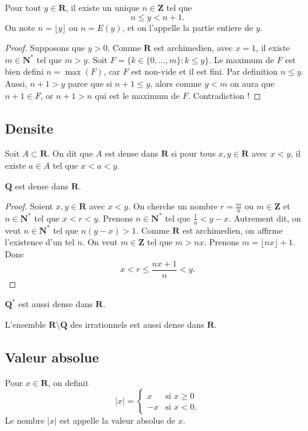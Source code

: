 \begin{proposition}
Pour tout $y\in \mathbf{R}$, il existe un unique $n\in \mathbf{Z}$ tel que 
$$
n\le y <n+1.
$$
On note $n=\lfloor y \rfloor$ ou $n=E(y)$, et on l'appelle la partie entiere de $y$.
\end{proposition}
\begin{proof}
Supposons que $y>0$. Comme $\mathbf{R}$ est archimedien, avec $x=1$, il existe $m\in \mathbf{N}^{*}$ tel que $m>y$. Soit $F=\{ k\in \{ 0,\dots,m \}:k\le y \}$. Le maximum de $F$ est bien defini $n=\max (F)$, car $F$ est non-vide et il est fini. Par definition $n\le y$. Aussi, $n+1>y$ parce que si $n+1\le y$, alors comme $y<m$ on aura que $n+1\in F$, or $n+1>n$ qui est le maximum de $F$. Contradiction !
\end{proof}

\subsection{Densite}
\begin{definition}[Densite]
Soit $A\subset \mathbf{R}$. On dit que $A$ est dense dans $\mathbf{R}$ si pour tous $x,y\in \mathbf{R}$ avec $x<y$, il existe $a\in A$ tel que $x<a<y$.
\end{definition}
\begin{theorem}
$\mathbf{Q}$ est dense dans $\mathbf{R}$.
\end{theorem}
\begin{proof}
Soient $x,y\in \mathbf{R}$ avec $x<y$. On cherche un nombre $r=\frac{m}{n}$ ou $m\in \mathbf{Z}$ et $n\in \mathbf{N}^{*}$ tel que $x<r<y$. Prenons $n\in \mathbf{N}^{*}$ tel que $\frac{1}{n}<y-x$. Autrement dit, on veut $n\in \mathbf{N}^{*}$ tel que $n(y-x)>1$. Comme $\mathbf{R}$ est archimedien, on affirme l'existence d'un tel $n$. On veut $m\in \mathbf{Z}$ tel que $m>nx$. Prenons $m=\lfloor nx \rfloor +1$. Donc
$$
x<r\le \frac{nx+1}{n}<y.
$$
\end{proof}
\begin{remark}
$\mathbf{Q}^{*}$ est aussi dense dans $\mathbf{R}$.
\end{remark}
\begin{remark}
L'ensemble $\mathbf{R}\setminus \mathbf{Q}$ des irrationnels est aussi dense dans $\mathbf{R}$.
\end{remark}
\subsection{Valeur absolue}
\begin{definition}
Pour $x \in \mathbf{R}$, on definit
$$
|x|=\begin{cases}
x & \text{si }x\ge 0 \\
-x  & \text{si }x<0 .
\end{cases}
$$
Le nombre $|x|$ est appelle la valeur absolue de $x$.
\end{definition}

